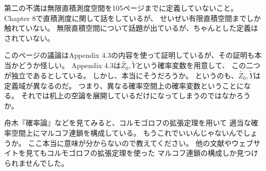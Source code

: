        第二の不満は無限直積測度空間を105ページまでに定義していないこと。
        Chapter 8で直積測度に関して話をしているが、
        せいぜい有限直積空間までしか触れていない。
        無限直積空間について話題が出ているが、ちゃんとした定義はされていない。

        このページの議論はAppendix 4.3の内容を使って証明しているが、その証明も本当かどうか怪しい。
        Appendix 4.3は$\tilde{Z_0}, \tilde{Y}$という確率変数を用意して、
        この二つが独立であるとしている。
        しかし、本当にそうだろうか。
        というのも、$\tilde{Z_0},\tilde{Y}$は定義域が異なるのだ。
        つまり、異なる確率空間上の確率変数ということになる。
        それでは机上の空論を展開しているだけになってしまうのではなかろうか。

        舟木『確率論』などを見てみると、コルモゴロフの拡張定理を用いて
        適当な確率空間上にマルコフ連鎖を構成している。
        もうこれでいいんじゃないんでしょうか。
        ここ本当に意味が分からないので教えてください。
        他の文献やウェブサイトを見てもコルモゴロフの拡張定理を使った
        マルコフ連鎖の構成しか見つけられませんでした。
